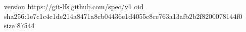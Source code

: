 version https://git-lfs.github.com/spec/v1
oid sha256:1e7c1c4c1de214a8471a8cb04436e1d4055c8ce763a13afb2b2f8200078144f0
size 87544
